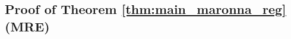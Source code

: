 \documentclass[times,sort&compress,3p]{elsarticle}
\begin{document}


\subsection{Proof of Theorem \ref{thm:main_maronna_reg} (MRE)}
\label{sect:proof-maronna-reg}
\end{document}
